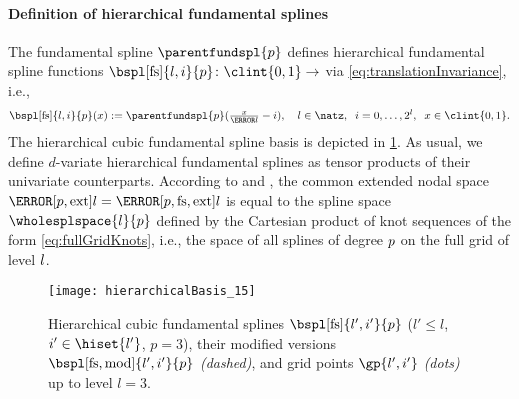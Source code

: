 \paragraph{Definition of hierarchical fundamental splines}

The fundamental spline $\parentfundspl{p}$ defines
hierarchical fundamental spline functions
$\bspl[\fs]{l,i}{p}\colon \clint{0, 1} \to \real$ via
\cref{eq:translationInvariance}, i.e.,
\begin{equation}
  \bspl[\fs]{l,i}{p}(x)
  := \parentfundspl{p}(\tfrac{x}{\ms{l}} - i),\quad
  l \in \natz,\;\;
  i = 0, \dotsc, 2^l,\;\;
  x \in \clint{0, 1}.
\end{equation}
The hierarchical cubic fundamental spline basis is depicted in
\cref{fig:hierarchicalFundamentalSpline}.
As usual, we define $d$-variate hierarchical fundamental splines
as tensor products of their univariate counterparts.
According to  and ,
the common extended nodal space
$\nsbspl[\ext]{\*l}{\*p} = \nsbspl[\fs,\ext]{\*l}{\*p}$
is equal to the spline space $\wholesplspace{\*l}{\*p}$
defined by the Cartesian product of
knot sequences of the form \eqref{eq:fullGridKnots},
i.e., the space of all splines of degree $\*p$ on the full grid of level $\*l$.

\begin{SCfigure}
  \texttt{[image: hierarchicalBasis\_15]}%
  \caption[%
    Hierarchical fundamental splines%
  ]{%
    Hierarchical cubic fundamental splines
    $\bspl[\fs]{l',i'}{p}$
    ($l' \le l$, $i' \in \hiset{l'}$, $p = 3$),
    their modified versions $\bspl[\fs,\modified]{l',i'}{p}$
    \emph{(dashed)}, and
    grid points $\gp{l',i'}$ \emph{(dots)} up to level $l = 3$.%
  }%
  \label{fig:hierarchicalFundamentalSpline}%
\end{SCfigure}

